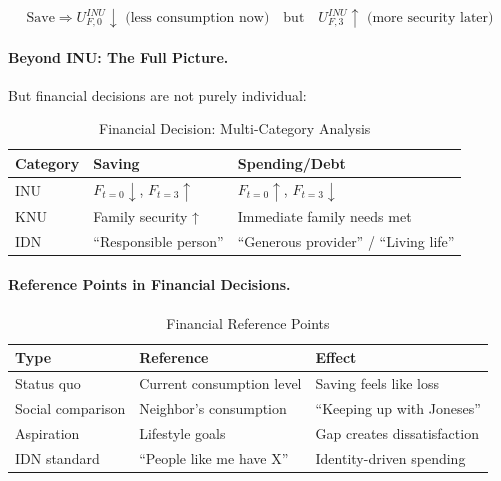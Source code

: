 \begin{equation}
\text{Save} \Rightarrow U^{INU}_{F,0} \downarrow \text{ (less consumption now)} \quad \text{but} \quad U^{INU}_{F,3} \uparrow \text{ (more security later)}
\end{equation}

\paragraph{Beyond INU: The Full Picture.}
But financial decisions are not purely individual:

\begin{table}[htbp]
\centering
\caption{Financial Decision: Multi-Category Analysis}
\label{tab:finance-categories}
\renewcommand{\arraystretch}{1.3}
\begin{tabular}{@{}lp{5cm}p{5cm}@{}}
\toprule
\textbf{Category} & \textbf{Saving} & \textbf{Spending/Debt} \\
\midrule
INU & $F_{t=0} \downarrow$, $F_{t=3} \uparrow$ & $F_{t=0} \uparrow$, $F_{t=3} \downarrow$ \\
KNU & Family security ↑ & Immediate family needs met \\
IDN & ``Responsible person'' & ``Generous provider'' / ``Living life'' \\
\bottomrule
\end{tabular}
\end{table}

\paragraph{Reference Points in Financial Decisions.}

\begin{table}[htbp]
\centering
\caption{Financial Reference Points}
\label{tab:finance-reference}
\renewcommand{\arraystretch}{1.3}
\begin{tabular}{@{}llp{5cm}@{}}
\toprule
\textbf{Type} & \textbf{Reference} & \textbf{Effect} \\
\midrule
Status quo & Current consumption level & Saving feels like loss \\
Social comparison & Neighbor's consumption & ``Keeping up with Joneses'' \\
Aspiration & Lifestyle goals & Gap creates dissatisfaction \\
IDN standard & ``People like me have X'' & Identity-driven spending \\
\bottomrule
\end{tabular}
\end{table}

